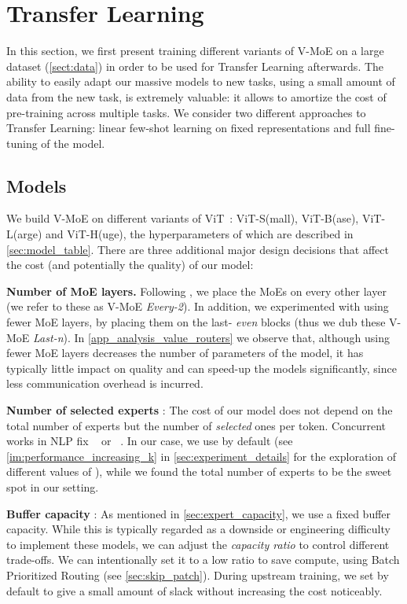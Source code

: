 \documentclass{article}
\newcommand{\abbv}{{V-MoE}}
\begin{document}
 \section{Transfer Learning}
In this section, we first present training different variants of \abbv{} on a large dataset 
(\cref{sect:data}) in order to
be used for Transfer Learning afterwards. The ability to easily adapt our massive models to new tasks,
using a small amount of data from the new task, is extremely valuable: it allows to amortize the cost 
of pre-training across multiple tasks. 
We consider two different approaches to Transfer Learning:
linear few-shot learning on fixed representations and full fine-tuning of the model.




\subsection{Models}
We build V-MoE on different variants of ViT~\cite{dosovitskiy2020image}:
ViT-S(mall), ViT-B(ase), ViT-L(arge) and ViT-H(uge), the hyperparameters of which are described in \cref{sec:model_table}.
There are three additional major design decisions that affect the cost (and potentially the quality) of our model:

\textbf{Number of MoE layers.}
Following \cite{lepikhin2020gshard}, we place the MoEs on every other layer (we refer to these as \abbv{} \emph{Every-2}).
In addition, we experimented with using fewer MoE layers, by placing them on the last- \emph{even} blocks 
(thus we dub these \abbv{} \emph{Last-n}). In \cref{app_analysis_value_routers} we observe that, although using fewer MoE 
layers decreases the number of parameters of the model, it has typically little impact on quality and can speed-up the models significantly,
since less communication overhead is incurred.

\textbf{Number of selected experts} :
The cost of our model does not depend on the total number of experts but the number of \emph{selected} ones per token. 
Concurrent works in NLP fix ~\cite{fedus2021switch} or ~\cite{shazeer2017outrageously,lepikhin2020gshard}.
In our case, we use by default  (see \cref{im:performance_increasing_k} in \cref{sec:experiment_details} for the exploration of different values of ), while we found the total number of experts  to be the sweet spot in our setting.

\textbf{Buffer capacity} :
As mentioned in \cref{sec:expert_capacity}, we use a fixed buffer capacity. While this is typically regarded as a downside or engineering difficulty to implement these models, we can adjust the \emph{capacity ratio} to control different trade-offs. We can intentionally
set it to a low ratio to save compute, using Batch Prioritized Routing (see \cref{sec:skip_patch}). 
During upstream training, we set  by default to give a small amount of slack without increasing the cost noticeably.
\end{document}

